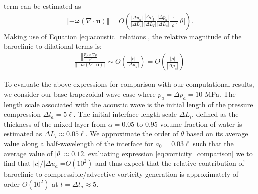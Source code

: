 \documentclass{jfm}%
\newcommand{\orderof}[1]{\ensuremath{\textit{O}\left(#1\right)}}
\newcommand{\abs}[1]{\ensuremath{\left|#1\right|}}
\newcommand{\norm}[1]{\ensuremath{\left\Vert#1\right\Vert}}
\begin{document}
term can be estimated as
\begin{align}
  \label{eq:compressible_advective_vorticity}%
  \norm{-\boldsymbol{\omega}\left(\nabla\cdot\boldsymbol{u}\right)} = %
  \orderof{%
  \frac{\abs{\Delta u_a}}{\abs{\Delta L_a}} \frac{\abs{\Delta \rho_I}}{\abs{\Delta L_I}}%
  \frac{\abs{\Delta p_a}}{\abs{\Delta L_a}} \frac{1}{\abs{\rho}^2}\abs{\theta}%
  }.%
\end{align}
%
Making use of Equation \eqref{eq:acoustic_relations}, the relative magnitude of the baroclinic to dilational terms is:
\begin{align} \label{eq:vorticity_comparison}
  \frac{\norm{\frac{\nabla\rho\times\nabla
  p}{\rho^2}}}{\norm{-\boldsymbol{\omega}\left(\nabla\cdot\boldsymbol{u}\right)}}
  \sim \orderof{\frac{\abs{c}}{\abs{\Delta u_a}}} = \orderof{\frac{\abs{\rho}}{\abs{\Delta \rho_a}}}%
\end{align}

To evaluate the above expressions for comparison with our
computational results, we consider our base trapezoidal wave case
where $p_a = \Delta p_a = 10$ MPa. The length scale associated with
the acoustic wave is the initial length of the pressure compression
$\Delta l_a=5\ell$. The initial interface length scale $\Delta L_i$,
defined as the thickness of the mixed layer from $\alpha=0.05$ to
$0.95$ volume fraction of water is estimated as
$\Delta L_i \approx 0.05\ell$. We approximate the order of $\theta$
based on its average value along a half-wavelength of the interface
for $a_0=0.03\ell$ such that the average value of
$\abs{\theta}\approx0.12$. evaluating expression
\eqref{eq:vorticity_comparison} we to find that
$\abs{c}/\abs{\Delta u_a}$=$\orderof{10^2}$ and thus expect that the relative
contribution of baroclinic to compressible/advective vorticity
generation is approximately of order $\orderof{10^2}$ at
$t = \Delta t_a \approx 5$.
\end{document}

